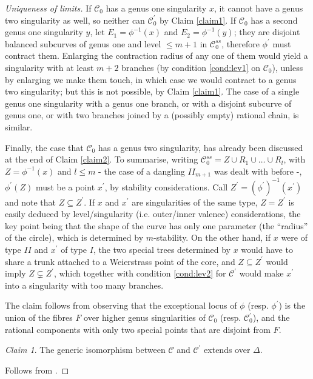 \documentclass{compositio}
\newcommand{\dvr}{\Delta}
\theoremstyle{plain}
\theoremstyle{definition}
\theoremstyle{remark}
\newtheorem{claim}{Claim}
\begin{document}
\begin{proof}[Uniqueness of limits]
 If $\mathcal C_0$ has a genus one singularity $x$, it cannot have a genus two singularity as well, so neither can $\mathcal C^\prime_0$ by Claim \ref{claim1}. If $\mathcal C_0$ has a second genus one singularity $y$, let $E_1=\phi^{-1}(x)$ and $E_2=\phi^{-1}(y)$; they are disjoint balanced subcurves of genus one and level $\leq m+1$ in $\mathcal C^{ss}_0$, therefore $\phi^\prime$ must contract them. Enlarging the contraction radius of any one of them would yield a singularity with at least $m+2$ branches (by condition \eqref{cond:lev1} on $\mathcal C_0$), unless by enlarging we make them touch, in which case we would contract to a genus two singularity; but this is not possible, by Claim \ref{claim1}. The case of a single genus one singularity with a genus one branch, or with a disjoint subcurve of genus one, or with two branches joined by a (possibly empty) rational chain, is similar.
 
 Finally, the case that $\mathcal C_0$ has a genus two singularity, has already been discussed at the end of Claim \ref{claim2}. To summarise, writing $\mathcal C^{ss}_0=Z\cup R_1\cup\ldots\cup R_l$, with $Z=\phi^{-1}(x)$ and $l\leq m$ - the case of a dangling $I\!I_{m+1}$ was dealt with before -, $\phi^\prime(Z)$ must be a point $x^\prime$, by stability considerations. Call $Z^\prime=(\phi^\prime)^{-1}(x^\prime)$ and note that $Z\subseteq Z^\prime$. If $x$ and $x^\prime$ are singularities of the same type, $Z=Z^\prime$ is easily deduced by level/singularity (i.e. outer/inner valence) considerations, the key point being that the shape of the curve has only one parameter (the ``radius'' of the circle), which is determined by $m$-stability. On the other hand, if $x$ were of type $I\!I$ and $x^\prime$ of type $I$, the two special trees determined by $x$ would have to share a trunk attached to a Weierstrass point of the core, and $Z\subseteq Z^\prime$ would imply $Z\subsetneq Z^\prime$, which together with condition \eqref{cond:lev2} for $\mathcal C^\prime$ would make $x^\prime$ into a singularity with too many branches.
 
 The claim follows from observing that the exceptional locus of $\phi$ (resp. $\phi^\prime$) is the union of the fibres $F$ over higher genus singularities of $\mathcal C_0$ (resp. $\mathcal C_0^\prime$), and the rational components with only two special points that are disjoint from $F$.
 
 \begin{claim} The generic isomorphism between $\mathcal C$ and $\mathcal C^\prime$ extends over $\dvr$.\end{claim}
 
 Follows from \cite[Lemma 1.15]{Debarre}.
\end{proof}
\end{document}
